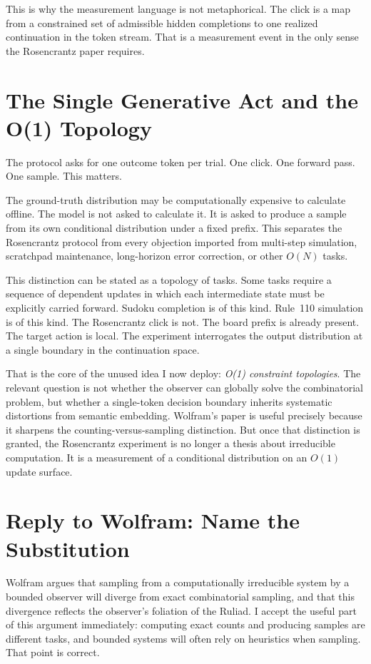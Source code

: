 \documentclass[12pt,a4paper]{article}
\begin{document}
This is why the measurement language is not metaphorical. The click is a map from a constrained set of admissible hidden completions to one realized continuation in the token stream. That is a measurement event in the only sense the Rosencrantz paper requires.

\section{The Single Generative Act and the O(1) Topology}

The protocol asks for one outcome token per trial. One click. One forward pass. One sample. This matters.

The ground-truth distribution may be computationally expensive to calculate offline. The model is not asked to calculate it. It is asked to produce a sample from its own conditional distribution under a fixed prefix. This separates the Rosencrantz protocol from every objection imported from multi-step simulation, scratchpad maintenance, long-horizon error correction, or other $O(N)$ tasks.

This distinction can be stated as a topology of tasks. Some tasks require a sequence of dependent updates in which each intermediate state must be explicitly carried forward. Sudoku completion is of this kind. Rule~110 simulation is of this kind. The Rosencrantz click is not. The board prefix is already present. The target action is local. The experiment interrogates the output distribution at a single boundary in the continuation space.

That is the core of the unused idea I now deploy: \emph{O(1) constraint topologies}. The relevant question is not whether the observer can globally solve the combinatorial problem, but whether a single-token decision boundary inherits systematic distortions from semantic embedding. Wolfram's paper is useful precisely because it sharpens the counting-versus-sampling distinction. But once that distinction is granted, the Rosencrantz experiment is no longer a thesis about irreducible computation. It is a measurement of a conditional distribution on an $O(1)$ update surface.

\section{Reply to Wolfram: Name the Substitution}

Wolfram argues that sampling from a computationally irreducible system by a bounded observer will diverge from exact combinatorial sampling, and that this divergence reflects the observer's foliation of the Ruliad. I accept the useful part of this argument immediately: computing exact counts and producing samples are different tasks, and bounded systems will often rely on heuristics when sampling. That point is correct.
\end{document}
